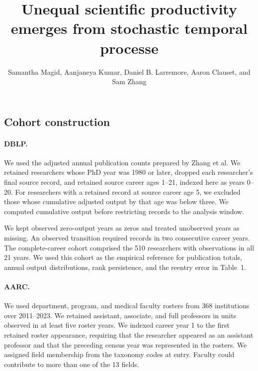 \documentclass[9pt,twoside,lineno]{pnas-new}
\title{Unequal scientific productivity emerges from stochastic temporal processe}
\author{Samantha Magid, Aanjaneya Kumar, Daniel B. Larremore, Aaron Clauset, and Sam Zhang}
\begin{document}

\maketitle

\SItext
\subsection*{Cohort construction}

\paragraph{DBLP.}
We used the adjusted annual publication counts prepared by Zhang et al.
We retained researchers whose PhD year was 1980 or later, dropped each
researcher's final source record, and retained source career ages 1--21,
indexed here as years 0--20. For researchers with a retained record at
source career age 5, we excluded those whose cumulative adjusted output
by that age was below three. We computed cumulative output before
restricting records to the analysis window.

We kept observed zero-output years as zeros and treated unobserved years
as missing. An observed transition required records in two consecutive
career years. The complete-career cohort comprised the 510 researchers
with observations in all 21 years. We used this cohort as the empirical
reference for publication totals, annual output distributions, rank
persistence, and the reentry error in Table~1.

\paragraph{AARC.}
We used department, program, and medical faculty rosters from 368
institutions over 2011--2023. We retained assistant, associate, and full
professors in units observed in at least five roster years. We indexed
career year 1 to the first retained roster appearance, requiring that
the researcher appeared as an assistant professor and that the
preceding census year was represented in the rosters. We assigned field
membership from the taxonomy codes at entry. Faculty could contribute
to more than one of the 13 fields.
\end{document}
